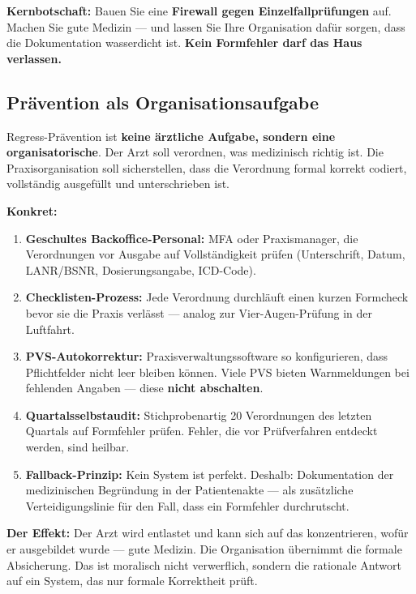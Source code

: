 \documentclass[a4paper]{umbruch-position}
\begin{document}
\begin{infobox}
\textbf{Kernbotschaft:} Bauen Sie eine \textbf{Firewall gegen Einzelfallpr\"ufungen} auf. Machen Sie gute Medizin --- und lassen Sie Ihre Organisation daf\"ur sorgen, dass die Dokumentation wasserdicht ist. \textbf{Kein Formfehler darf das Haus verlassen.}
\end{infobox}

\subsection{Pr\"avention als Organisationsaufgabe}

Regress-Pr\"avention ist \textbf{keine \"arztliche Aufgabe, sondern eine organisatorische}. Der Arzt soll verordnen, was medizinisch richtig ist. Die Praxisorganisation soll sicherstellen, dass die Verordnung formal korrekt codiert, vollst\"andig ausgef\"ullt und unterschrieben ist.

\textbf{Konkret:}
\begin{enumerate}[nosep]
  \item \textbf{Geschultes Backoffice-Personal:} MFA oder Praxismanager, die Verordnungen vor Ausgabe auf Vollst\"andigkeit pr\"ufen (Unterschrift, Datum, LANR/BSNR, Dosierungsangabe, ICD-Code).
  \item \textbf{Checklisten-Prozess:} Jede Verordnung durchl\"auft einen kurzen Formcheck bevor sie die Praxis verl\"asst --- analog zur Vier-Augen-Pr\"ufung in der Luftfahrt.
  \item \textbf{PVS-Autokorrektur:} Praxisverwaltungssoftware so konfigurieren, dass Pflichtfelder nicht leer bleiben k\"onnen. Viele PVS bieten Warnmeldungen bei fehlenden Angaben --- diese \textbf{nicht abschalten}.
  \item \textbf{Quartalsselbstaudit:} Stichprobenartig 20 Verordnungen des letzten Quartals auf Formfehler pr\"ufen. Fehler, die vor Pr\"ufverfahren entdeckt werden, sind heilbar.
  \item \textbf{Fallback-Prinzip:} Kein System ist perfekt. Deshalb: Dokumentation der medizinischen Begr\"undung in der Patientenakte --- als zus\"atzliche Verteidigungslinie f\"ur den Fall, dass ein Formfehler durchrutscht.
\end{enumerate}

\textbf{Der Effekt:} Der Arzt wird entlastet und kann sich auf das konzentrieren, wof\"ur er ausgebildet wurde --- gute Medizin. Die Organisation \"ubernimmt die formale Absicherung. Das ist moralisch nicht verwerflich, sondern die rationale Antwort auf ein System, das nur formale Korrektheit pr\"uft.
\end{document}

